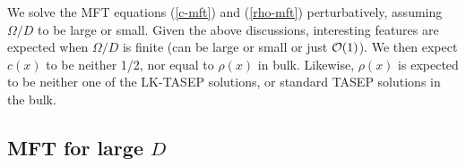 \documentclass[aps,pre,twocolumn,superscriptaddress,amsmath,amssymb,longbibliography,floatfix]{revtex4}
\begin{document}
{%

We solve the MFT equations (\ref{c-mft}) and (\ref{rho-mft}) perturbatively, assuming $\Omega/D$ to be large or small.
Given the above discussions, interesting features are expected when $\Omega/D$ is finite (can be large or small or just ${\cal O}(1)$). We then expect $c(x)$ to be neither 1/2, nor equal to $\rho(x)$ in bulk. Likewise, $\rho(x)$ is expected to be neither one of the LK-TASEP solutions, or standard TASEP solutions in the bulk.  

\subsection{MFT for large $D$}

}
\end{document}
